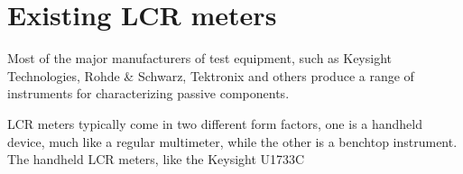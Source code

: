 \section{Existing LCR meters} \label{sec:ExistingLCRMeters}
Most of the major manufacturers of test equipment, such as Keysight Technologies, Rohde \& Schwarz, Tektronix and others produce a range of instruments for characterizing passive components. 

LCR meters typically come in two different form factors, one is a handheld device, much like a regular multimeter, while the other is a benchtop instrument. The handheld LCR meters, like the Keysight U1733C\cite*{KeysightU1733C}







